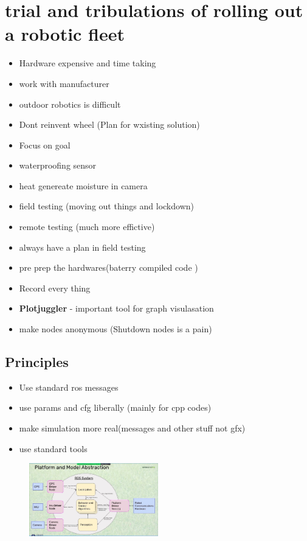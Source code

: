 \documentclass[a4paper]{article}
\begin{document}
\section{trial and tribulations of rolling out a robotic fleet}
\begin{itemize}
	\item Hardware expensive and time taking
	\item work with manufacturer
	\item outdoor robotics is difficult
	\item Dont reinvent wheel (Plan for wxisting solution)
	\item Focus on goal
	\item waterproofing sensor
	\item heat genereate moisture in camera
	\item field testing (moving out things and lockdown)
	\item remote testing (much more effictive)
	\item always have a plan in field testing
	\item pre prep the hardwares(baterry compiled code )
	\item Record every thing
	\item \textbf{Plotjuggler} - important tool for graph visulasation
	\item make nodes anonymous (Shutdown nodes is a pain)
\end{itemize}
\subsection{Principles}
\begin{itemize}
	\item Use standard ros messages
    \item use params and cfg liberally (mainly for cpp codes) 
    \item make simulation more real(messages and other stuff not gfx)
    \item use standard tools 
\end{itemize}
\begin{figure}[htpb]
	\centering
	\includegraphics[width=0.5\textwidth]{platform_abstraction.png}
	\caption{}
	\label{fig:}
\end{figure}
\end{document}
